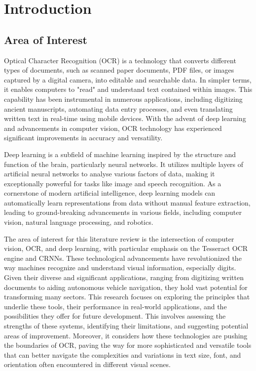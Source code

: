 \chapter{Introduction}
\label{chap:intro}


\section{Area of Interest}

Optical Character Recognition (OCR) is a technology that converts different types of documents, such as scanned paper documents, PDF files, or images captured by a digital camera, into editable and searchable data. In simpler terms, it enables computers to "read" and understand text contained within images. This capability has been instrumental in numerous applications, including digitizing ancient manuscripts, automating data entry processes, and even translating written text in real-time using mobile devices. With the advent of deep learning and advancements in computer vision, OCR technology has experienced significant improvements in accuracy and versatility.

Deep learning is a subfield of machine learning inspired by the structure and function of the brain, particularly neural networks. It utilizes multiple layers of artificial neural networks to analyse various factors of data, making it exceptionally powerful for tasks like image and speech recognition. As a cornerstone of modern artificial intelligence, deep learning models can automatically learn representations from data without manual feature extraction, leading to ground-breaking advancements in various fields, including computer vision, natural language processing, and robotics.

The area of interest for this literature review is the intersection of computer vision, OCR, and deep learning, with particular emphasis on the Tesseract OCR engine and CRNNs. These technological advancements have revolutionized the way machines recognize and understand visual information, especially digits. Given their diverse and significant applications, ranging from digitizing written documents to aiding autonomous vehicle navigation, they hold vast potential for transforming many sectors. This research focuses on exploring the principles that underlie these tools, their performance in real-world applications, and the possibilities they offer for future development. This involves assessing the strengths of these systems, identifying their limitations, and suggesting potential areas of improvement. Moreover, it considers how these technologies are pushing the boundaries of OCR, paving the way for more sophisticated and versatile tools that can better navigate the complexities and variations in text size, font, and orientation often encountered in different visual scenes.

